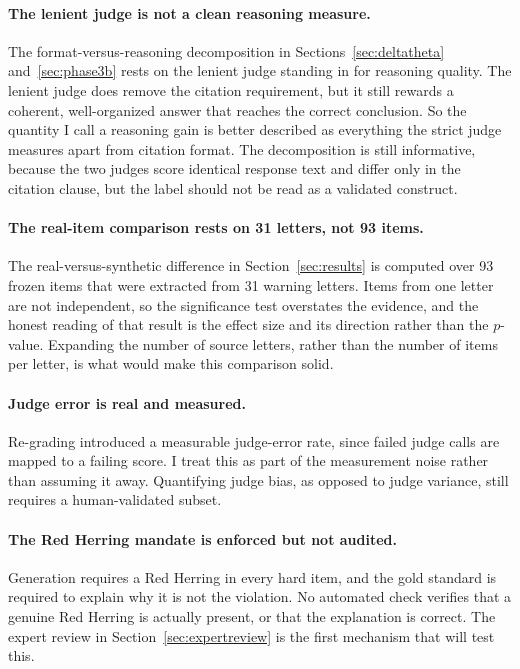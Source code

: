 \paragraph{The lenient judge is not a clean reasoning measure.}
The format-versus-reasoning decomposition in
Sections~\ref{sec:deltatheta} and~\ref{sec:phase3b} rests on the lenient
judge standing in for reasoning quality. The lenient judge does remove
the citation requirement, but it still rewards a coherent, well-organized
answer that reaches the correct conclusion. So the quantity I call a
reasoning gain is better described as everything the strict judge
measures apart from citation format. The decomposition is still
informative, because the two judges score identical response text and
differ only in the citation clause, but the label should not be read as a
validated construct.

\paragraph{The real-item comparison rests on 31 letters, not 93 items.}
The real-versus-synthetic difference in Section~\ref{sec:results} is
computed over 93 frozen items that were extracted from 31 warning
letters. Items from one letter are not independent, so the significance
test overstates the evidence, and the honest reading of that result is
the effect size and its direction rather than the $p$-value. Expanding
the number of source letters, rather than the number of items per letter,
is what would make this comparison solid.

\paragraph{Judge error is real and measured.}
Re-grading introduced a measurable judge-error rate, since failed judge
calls are mapped to a failing score. I treat this as part of the
measurement noise rather than assuming it away. Quantifying judge bias,
as opposed to judge variance, still requires a human-validated subset.

\paragraph{The Red Herring mandate is enforced but not audited.}
Generation requires a Red Herring in every hard item, and the gold
standard is required to explain why it is not the violation. No automated
check verifies that a genuine Red Herring is actually present, or that
the explanation is correct. The expert review in
Section~\ref{sec:expertreview} is the first mechanism that will test
this.

